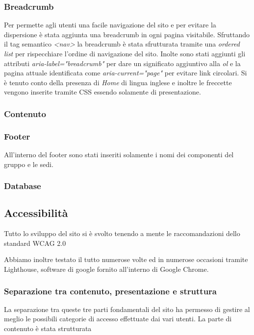 \subsubsection{Breadcrumb}
Per permette agli utenti una facile navigazione del sito e per evitare la dispersione è stata aggiunta una breadcrumb in ogni pagina visitabile. Sfruttando il tag semantico \textit{<nav>} la breadcrumb è stata sfrutturata tramite una \textit{ordered list} per rispecchiare l'ordine di navigazione del sito. Inolte sono stati aggiunti gli attributi \textit{aria-label="breadcrumb"} per dare un significato aggiuntivo alla \textit{ol} e la pagina attuale identificata come \textit{aria-current="page"} per evitare link circolari. Si è tenuto conto della presenza di \textit{Home} di lingua inglese e inoltre le freccette vengono inserite tramite CSS essendo solamente di presentazione.

\subsubsection{Contenuto}
\subsubsection{Footer}
All'interno del footer sono stati inseriti solamente i nomi dei componenti del gruppo e le sedi.
\subsubsection{Database}

\subsection{Accessibilità}
Tutto lo sviluppo del sito si è svolto tenendo a mente le raccomandazioni dello standard WCAG 2.0

Abbiamo inoltre testato il tutto numerose volte ed in numerose occasioni tramite Lighthouse, software di google fornito all'interno di Google Chrome.

\subsubsection{Separazione tra contenuto, presentazione e struttura}
La separazione tra queste tre parti fondamentali del sito ha permesso di gestire al meglio le possibili categorie di accesso effettuate dai vari utenti. La parte di contenuto è stata strutturata 